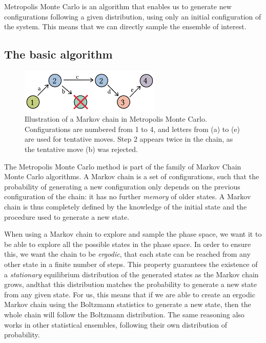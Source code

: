 \documentclass[thesis]{subfiles}
\begin{document}
Metropolis Monte Carlo is an algorithm that enables us to generate new
configurations following a given distribution, using only an initial
configuration of the system. This means that we can directly sample the ensemble
of interest.

\subsection{The basic algorithm}

\begin{figure}[ht]
    \centering
    \includegraphics[width=0.6\textwidth]{figures/images/mc-chain}
    \caption{Illustration of a Markov chain in Metropolis Monte Carlo.
    Configurations are numbered from 1 to 4, and letters from (a) to (e) are used
    for tentative moves. Step 2 appears twice in the chain, as the tentative
    move (b) was rejected.}
    \label{fig:mc:chain}
\end{figure}

The Metropolis Monte Carlo method is part of the family of Markov Chain Monte
Carlo algorithms. A Markov chain is a set of configurations, such that the
probability of generating a new configuration only depends on the previous
configuration of the chain: it has no further \emph{memory} of older states. A
Markov chain is thus completely defined by the knowledge of the initial state
and the procedure used to generate a new state.

When using a Markov chain to explore and sample the phase space, we want it to
be able to explore all the possible states in the phase space. In order to
ensure this, we want the chain to be \emph{ergodic}, \ie that each state can be
reached from any other state in a finite number of steps. This property
guarantees the existence of a \emph{stationary} equilibrium distribution of the
generated states as the Markov chain grows, andthat this distribution matches
the probability to generate a new state from any given state. For us, this means
that if we are able to create an ergodic Markov chain using the Boltzmann
statistics to generate a new state, then the whole chain will follow the
Boltzmann distribution. The same reasoning also works in other statistical
ensembles, following their own distribution of probability.
\end{document}
